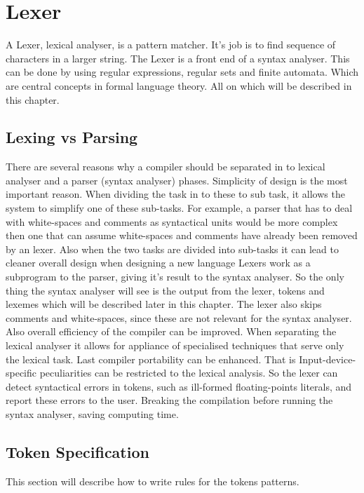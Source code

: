 \chapter{Lexer}
A Lexer, lexical analyser, is a pattern matcher. It's job is to find sequence 
of characters in a larger string. The Lexer is a front end of a syntax 
analyser. \cite{sebesta2012}
This can be done by using regular expressions, regular sets and finite
automata. Which are central concepts in formal language theory. \cite{Aho1990}
All on which will be described in this chapter.

\section{Lexing vs Parsing}
There are several reasons why a compiler should be separated in to lexical 
analyser and a parser (syntax analyser) phases. Simplicity of design is the most
important reason. When dividing the task in to these to sub task, it allows the
system to simplify one of these sub-tasks. For example, a parser that has to 
deal with white-spaces and comments as syntactical units would be more complex 
then one that can assume white-spaces and comments have already been removed by 
an lexer. Also when the two tasks are divided into sub-tasks it can lead to 
cleaner overall design when designing a new language \cite{Aho2006}
Lexers work as a subprogram to the parser, giving it's result to the syntax 
analyser. So the only thing the syntax analyser will see is the output from the 
lexer, tokens and lexemes which will be described later in this chapter. 
\cite{sebesta2012}
The lexer also skips comments and white-spaces, since these are not relevant 
for the syntax analyser. \cite{sebesta2012}
Also overall efficiency of the compiler can be improved. When separating the 
lexical analyser it allows for appliance of specialised techniques that serve 
only the lexical task. \cite{Aho2006}
Last compiler portability can be enhanced. That is Input-device-specific 
peculiarities can be restricted to the lexical analysis. \cite{Aho2006}
So the lexer can detect syntactical errors in tokens, such as ill-formed 
floating-points literals, and report these errors to the user. 
\cite{sebesta2012} Breaking the compilation before running the syntax analyser, 
saving computing time. 

\section{Token Specification}
This section will describe how to write rules for the tokens patterns. 
